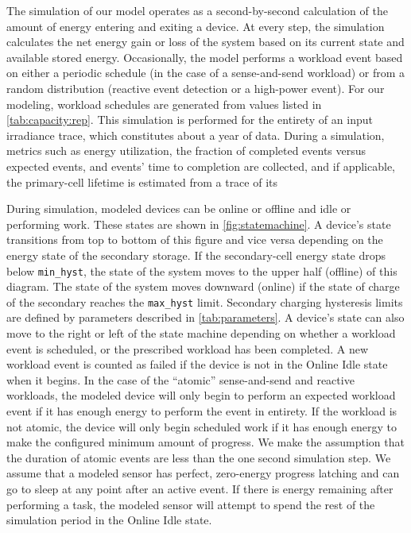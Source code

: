 The simulation of our model operates as a second-by-second calculation of the
amount of energy entering and exiting a device.
At every step, the simulation calculates the net energy gain or loss of the
system based on its current state and available stored energy.  Occasionally,
the model performs a workload event based on either a periodic schedule (in the
case of a sense-and-send workload) or from a random distribution (reactive
event detection or a high-power event). For our modeling, workload schedules
are generated from values listed in \cref{tab:capacity:rep}.
This simulation is performed for the entirety of an
input irradiance trace, which constitutes about a year of data. During
a simulation, metrics such as energy utilization, the fraction of completed
events versus expected events, and events' time to completion are collected,
and if applicable, the primary-cell lifetime is estimated from a trace of its

During simulation, modeled devices can be online or offline and idle or performing
work. These states are shown in \cref{fig:statemachine}.  A device's state
transitions from top to bottom of this figure and vice versa depending on the
energy state of the secondary storage.
If the secondary-cell energy state drops below \texttt{min\_hyst},
the state of the system moves to the upper
half (offline) of this diagram. The state of the system moves downward (online)
if the state of charge of the secondary reaches the \texttt{max\_hyst}
limit. Secondary charging hysteresis limits are defined by parameters described in \cref{tab:parameters}.
A device's state can also move
to the right or left of the state machine depending on whether a workload event
is scheduled, or the prescribed workload has been completed. A new
workload event is counted as failed if the device is not in the \textsf{Online
Idle} state when it begins.
In the case of the ``atomic''
sense-and-send and reactive workloads, the modeled device will only begin
to perform an expected workload event if it has
enough energy to perform the event in entirety. If the workload is not atomic,
the device will only begin scheduled work if it has enough energy to make the
configured minimum amount of progress. We
make the assumption that the duration of atomic events are less than the one
second simulation step.
We assume that a modeled sensor has perfect, zero-energy progress
latching and can go to sleep at any point after an active event. If
there is energy remaining after performing a task, the modeled sensor will
attempt to spend the rest of the simulation period in the \textsf{Online Idle} state.

